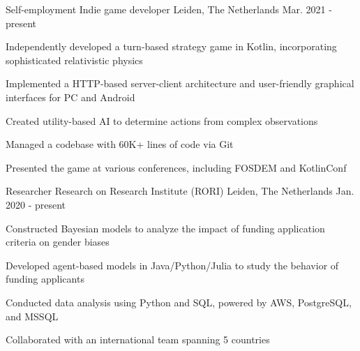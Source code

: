 

\begin{cventries}

  \cventry
    {Self-employment} %
    {Indie game developer} %
    {Leiden, The Netherlands} %
    {Mar. 2021 - present} %
    {
      \begin{cvitems} %
        \item{Independently developed a turn-based strategy game in Kotlin, incorporating sophisticated relativistic physics}
        \item{Implemented a HTTP-based server-client architecture and user-friendly graphical interfaces for PC and Android}
        \item{Created utility-based AI to determine actions from complex observations}
        \item{Managed a codebase with 60K+ lines of code via Git}
        \item{Presented the game at various conferences, including FOSDEM and KotlinConf}
      \end{cvitems}
    }

  \cventry
    {Researcher} %
    {Research on Research Institute (RORI)} %
    {Leiden, The Netherlands} %
    {Jan. 2020 - present} %
    {
      \begin{cvitems} %
        \item{Constructed Bayesian models to analyze the impact of funding application criteria on gender biases}
        \item{Developed agent-based models in Java/Python/Julia to study the behavior of funding applicants}
        \item{Conducted data analysis using Python and SQL, powered by AWS, PostgreSQL, and MSSQL}
        \item{Collaborated with an international team spanning 5 countries}
      \end{cvitems}
    }


\end{cventries}
